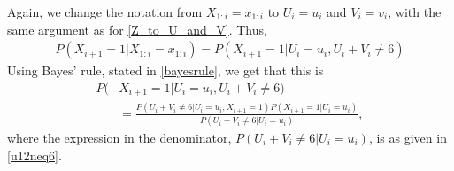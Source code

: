 Again, we change the notation from $X_{1:i}=x_{1:i}$ to $U_i=u_i$ and $V_i=v_i$, with the same argument as for \eqref{Z_to_U_and_V}. Thus,
\begin{equation}
    \begin{aligned}
        P(X_{i+1}=1|X_{1:i}=x_{1:i}) = P(X_{i+1}=1|U_i=u_i,U_i+V_i\neq6)
    \end{aligned}
\end{equation}
Using Bayes' rule, stated in \eqref{bayesrule}, we get that this is
\begin{equation}
\label{nextisred_bayes_rule}
    \begin{aligned}
        P(&X_{i+1}=1|U_i=u_i,U_i+V_i\neq6) \\[6pt]
        &= \frac{P(U_i+V_i\neq6|U_i=u_i,X_{i+1}=1)P(X_{i+1}=1|U_i=u_i)}
        {P(U_i+V_i\neq6|U_i=u_i)},
    \end{aligned}
\end{equation}
where the expression in the denominator, $P(U_i+V_i\neq6|U_i=u_i)$, is as given in \eqref{u12neq6}. 

